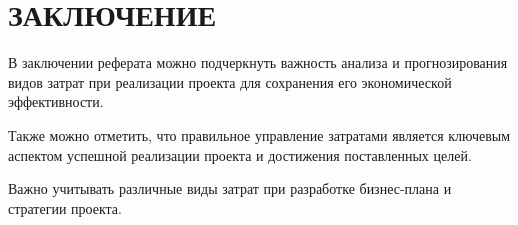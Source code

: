 \chapter*{\hfill{\centering  ЗАКЛЮЧЕНИЕ}\hfill}

В заключении реферата можно подчеркнуть важность анализа и прогнозирования видов затрат при реализации проекта для сохранения его экономической эффективности. 

Также можно отметить, что правильное управление затратами является ключевым аспектом успешной реализации проекта и достижения поставленных целей. 

Важно учитывать различные виды затрат при разработке бизнес-плана и стратегии проекта.